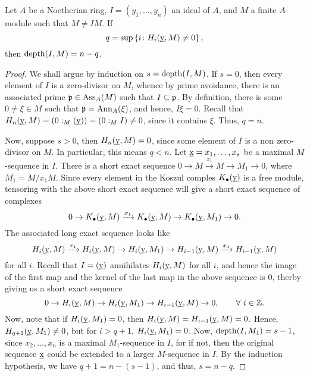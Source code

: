 \begin{theorem}
    Let $A$ be a Noetherian ring, $I = (y_1,\dots,y_n)$ an ideal of $A$, and $M$ a finite $A$-module such that $M\ne IM$. If 
    \begin{equation*}
        q = \sup\left\{i\colon H_i(\underbar{y}, M)\ne 0\right\}, 
    \end{equation*}
    then $\operatorname{depth}(I, M) = n - q$.
\end{theorem}
\begin{proof}
    We shall argue by induction on $s = \operatorname{depth}(I, M)$. If $s = 0$, then every element of $I$ is a zero-divisor on $M$, whence by prime avoidance, there is an associated prime $\mathfrak{p}\in\operatorname{Ass}_A(M)$ such that $I\subseteq\mathfrak{p}$. By definition, there is some $0\ne\xi\in M$ such that $\mathfrak{p} = \operatorname{Ann}_A(\xi)$, and hence, $I\xi = 0$. Recall that $H_n(\underbar{y}, M) = (0 :_M (\underbar{y})) = (0 :_M I)\ne 0$, since it contains $\xi$. Thus, $q = n$.

    Now, suppose $s > 0$, then $H_n(\underbar{y}, M) = 0$, since some element of $I$ is a non zero-divisor on $M$. In particular, this means $q < n$. Let $\underbar{x} = x_1,\dots,x_s$ be a maximal $M$-sequence in $I$. There is a short exact sequence $0\to M\xrightarrow{x_1} M\to M_1\to 0$, where $M_1 = M/x_1M$. Since every element in the Koszul comples $K_\bullet(\underbar{y})$ is a free module, tensoring with the above short exact sequence will give a short exact sequence of complexes 
    \begin{equation*}
        0\to K_\bullet(\underbar{y}, M)\xrightarrow{x_1} K_\bullet(\underbar{y}, M)\to K_\bullet(\underbar{y}, M_1)\to 0.
    \end{equation*}
    The associated long exact sequence looks like 
    \begin{equation*}
        H_i(\underbar{y}, M)\xrightarrow{x_1} H_i(\underbar{y}, M)\to H_i(\underbar{y}, M_1)\to H_{i - 1}(\underbar{y}, M)\xrightarrow{x_1} H_{i - 1}(\underbar{y}, M)
    \end{equation*}
    for all $i$. Recall that $I = (\underbar{y})$ annihilates $H_i(\underbar{y}, M)$ for all $i$, and hence the image of the first map and the kernel of the last map in the above sequence is $0$, therby giving us a short exact sequence 
    \begin{equation*}
        0\to H_i(\underbar{y}, M)\to H_i(\underbar{y}, M_1)\to H_{i - 1}(\underbar{y}, M)\to 0,\qquad\forall~i\in\mathbb{Z}.
    \end{equation*}
    Now, note that if $H_i(\underbar{y}, M_1) = 0$, then $H_i(\underbar{y}, M) = H_{i - 1}(\underbar{y}, M) = 0$. Hence, $H_{q + 1}(\underbar{y}, M_1)\ne 0$, but for $i > q + 1$, $H_i(\underbar{y}, M_1) = 0$. Now, $\operatorname{depth}(I, M_1) = s - 1$, since $x_2,\dots,x_n$ is a maximal $M_1$-sequence in $I$, for if not, then the original sequence $\underbar{x}$ could be extended to a larger $M$-sequence in $I$. By the induction hypothesis, we have $q + 1 = n - (s - 1)$, and thus, $s = n - q$.
\end{proof}

